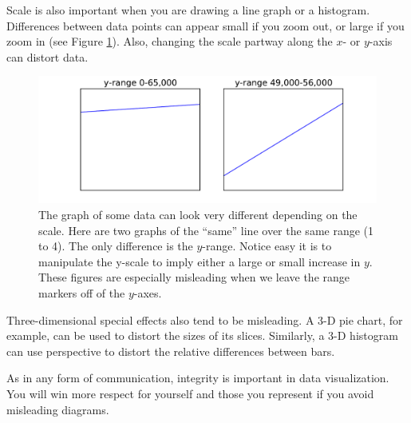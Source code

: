 Scale is also important when you are drawing a line graph or a histogram. 
Differences between data points can appear small if you zoom out, or large if you zoom in (see Figure \ref{fig:dog_plots}). 
Also, changing the scale partway along the $x$- or $y$-axis can distort data.

\begin{figure}
\centering
\includegraphics[width=\textwidth]{dog_plots.pdf}
\caption{The graph of some data can look very different depending on the scale. 
Here are two graphs of the ``same'' line over the same range (1 to 4). 
The only difference is the $y$-range. Notice easy it is to manipulate the y-scale to imply either a large or small increase in $y$. 
These figures are especially misleading when we leave the range markers off of the $y$-axes.}
\label{fig:dog_plots}
\end{figure}

Three-dimensional special effects also tend to be misleading. 
A 3-D pie chart, for example, can be used to distort the sizes of its slices. 
Similarly, a 3-D histogram can use perspective to distort the relative differences between bars.

As in any form of communication, integrity is important in data visualization. 
You will win more respect for yourself and those you represent if you avoid misleading diagrams.

\printbibliography